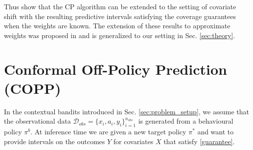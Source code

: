 Thus \cite{tibshirani2020conformal} show that the CP algorithm can be extended to the setting of covariate shift with the resulting predictive intervals satisfying the coverage guarantees when the weights are known. The extension of these results to approximate weights was proposed in  \cite{lei2020conformal} and is generalized to our setting in Sec. \ref{sec:theory}. 
\section{Conformal Off-Policy Prediction (COPP)}
In the contextual bandits introduced in Sec. \ref{sec:problem_setup}, we assume that the observational data $\mathcal{D}_{obs} = \{x_i, a_i, y_i\}_{i=1}^{n_{obs}}$ is generated from a behavioural policy $\pi^b$. At inference time we are given a new target policy $\pi^*$ and want to provide intervals on the outcomes $Y$ for covariates $X$ that satisfy \eqref{guarantee}.

